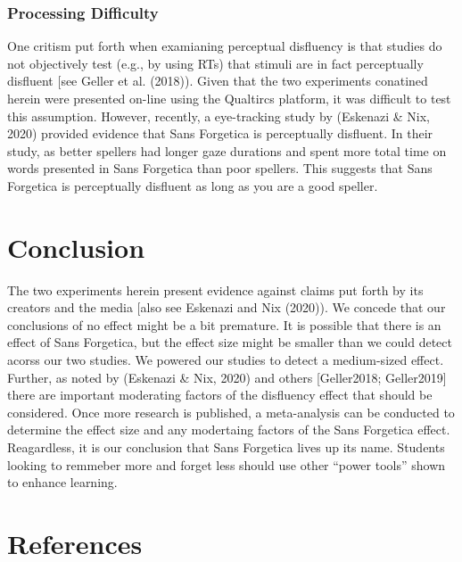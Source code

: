 \documentclass[english,pdf]{apa6}
\begin{document}
\hypertarget{processing-difficulty}{%
\subsubsection{Processing Difficulty}\label{processing-difficulty}}

One critism put forth when examianing perceptual disfluency is that studies do not objectively test (e.g., by using RTs) that stimuli are in fact perceptually disfluent {[}see Geller et al. (2018)). Given that the two experiments conatined herein were presented on-line using the Qualtircs platform, it was difficult to test this assumption. However, recently, a eye-tracking study by (Eskenazi \& Nix, 2020) provided evidence that Sans Forgetica is perceptually disfluent. In their study, as better spellers had longer gaze durations and spent more total time on words presented in Sans Forgetica than poor spellers. This suggests that Sans Forgetica is perceptually disfluent as long as you are a good speller.

\hypertarget{conclusion}{%
\section{Conclusion}\label{conclusion}}

The two experiments herein present evidence against claims put forth by its creators and the media {[}also see Eskenazi and Nix (2020)). We concede that our conclusions of no effect might be a bit premature. It is possible that there is an effect of Sans Forgetica, but the effect size might be smaller than we could detect acorss our two studies. We powered our studies to detect a medium-sized effect. Further, as noted by (Eskenazi \& Nix, 2020) and others {[}Geller2018; Geller2019{]} there are important moderating factors of the disfluency effect that should be considered. Once more research is published, a meta-analysis can be conducted to determine the effect size and any modertaing factors of the Sans Forgetica effect. Reagardless, it is our conclusion that Sans Forgetica lives up its name. Students looking to remmeber more and forget less should use other \enquote{power tools} shown to enhance learning.

\newpage

\hypertarget{references}{%
\section{References}\label{references}}
\end{document}
